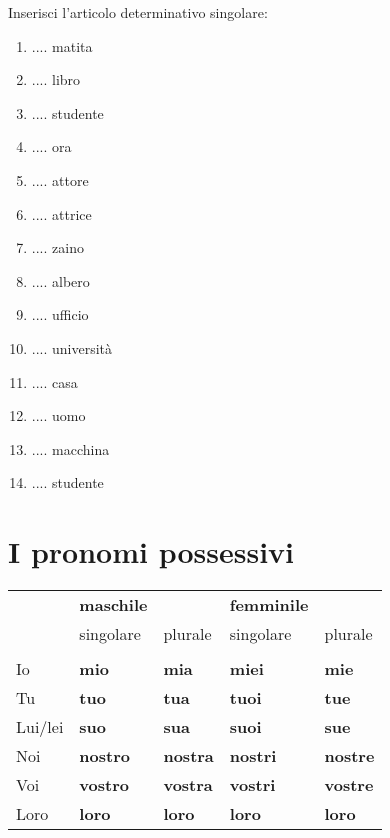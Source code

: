 \documentclass[letter,11pt]{article}
\newcommand{\myCode}[1]{\colorbox{gray!30}{#1}}
\begin{document}
\vskip 0.5in
\myCode{Inserisci l'articolo determinativo singolare: }

\begin{multicols}{2}
\begin{enumerate}
    \item .... matita
    \item .... libro
    \item .... studente
    \item .... ora
    \item .... attore
    \item .... attrice
    \item .... zaino
    \item .... albero
    \item .... ufficio
    \item .... università
    \item .... casa
    \item .... uomo
    \item .... macchina
    \item .... studente
\end{enumerate}
\end{multicols}

\vskip 0.5in
\section*{I pronomi possessivi}

\vskip 0.2in

\begin{tabular}{ |p{3cm}| p{2cm}| p{2cm}| p{2cm}| p{2cm}| }
    & {\bf maschile} & & {\bf femminile} &  \\
    & singolare & plurale & singolare & plurale  \\
    \hline
    \hline
    & & & & \\ \hline
    Io   &  {\bf mio} & {\bf mia} & {\bf miei} & {\bf mie}  \\ \hline
    Tu   &  {\bf tuo} & {\bf tua} & {\bf tuoi} & {\bf tue}  \\ \hline
    Lui/lei &  {\bf suo} & {\bf sua} & {\bf suoi} & {\bf sue}  \\ \hline
    Noi  &  {\bf nostro} & {\bf nostra} & {\bf nostri} & {\bf nostre}  \\ \hline
    Voi  &  {\bf vostro} & {\bf vostra} & {\bf vostri} & {\bf vostre}  \\ \hline
    Loro &  {\bf loro} & {\bf loro} & {\bf loro} & {\bf loro}  \\ \hline
    \hline

\end{tabular}
\end{document}
